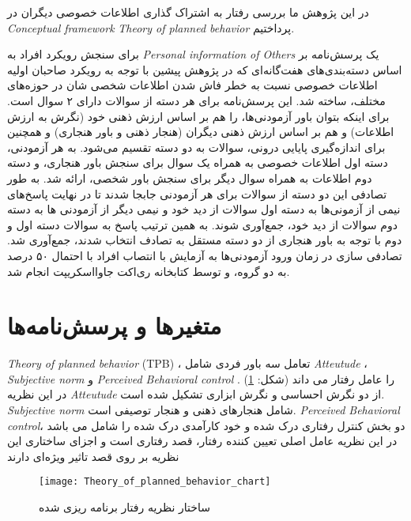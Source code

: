 در این پژوهش ما بررسی رفتار به اشتراک گذاری اطلاعات خصوصی دیگران در
\textit{
  \gls{Conceptual framework}
}
\textit{
  \gls{Theory of planned behavior}
}
پرداختیم.

برای سنجش رویکرد‍ افراد به
\textit{
  \gls{Personal information of Others}
}
یک پرسش‌نامه بر اساس دسته‌بندی‌های هفت‌گانه‌ای که در پژوهش پیشین با توجه به رویکرد صاحبان
اولیه اطلاعات خصوصی نسبت به خطر فاش شدن اطلاعات شخصی شان در حوزه‌های مختلف، ساخته شد.
این پرسش‌نامه برای هر دسته از سوالات دارای ۲ سوال است. برای اینکه بتوان باور
آزمودنی‌ها، را هم بر اساس ارزش ذهنی خود
\!(نگرش به ارزش اطلاعات)
و هم بر اساس ارزش ذهنی دیگران
\!(هنجار ذهنی و باور هنجاری)
و همچنین برای اندازه‌گیری پایایی درونی،
سوالات به دو دسته تقسیم ‌می‌شود.
به هر آزمودنی، دسته اول اطلاعات خصوصی به همراه یک سوال برای سنجش باور هنجاری، و دسته دوم
اطلاعات به همراه سوال دیگر برای سنجش باور شخصی، ارائه شد. به طور تصادفی این دو دسته از
سوالات برای هر آزمودنی جابجا شدند تا در نهایت پاسخ‌های نیمی از آزمونی‌ها به دسته اول سوالات از دید خود و نیمی
دیگر از آزمودنی ها به دسته دوم سوالات از دید خود، جمع‌آوری شوند. به همین ترتیب پاسخ به سوالات دسته اول و دوم
با توجه به باور هنجاری از دو دسته مستقل به تصادف انتخاب شدند، جمع‌آوری شد. تصادفی سازی در زمان ورود آزمودنی‌ها
به آزمایش با انتصاب افراد با احتمال ۵۰ درصد به دو گروه، و توسط کتابخانه ری‌اکت جاوااسکریپت انجام شد.

\section{متغیر‌ها و پرسش‌نامه‌ها}

\ifPlennedBahaviorTheory
  \textit{\gls{Theory of planned behavior}}
  \!(TPB)
  ، تعامل سه باور فردی شامل
  \textit{\gls{Atteutude}} ،
  \textit{\gls{Subjective norm}} و
  \textit{\gls{Perceived Behavioral control}}
  را عامل رفتار می داند
  \!(شکل: \ref{fig:Theory_of_planned_behavior_chart})
  \!\citep{ajzenTheoryPlannedBehavior2020}.
  در این نظریه
  \textit{\gls{Atteutude}}
  از دو نگرش احساسی و نگرش ابزاری تشکیل شده است.
  \textit{\gls{Subjective norm}}
  شامل  هنجارهای ذهنی و هنجار توصیفی است.
  \textit{\gls{Perceived Behavioral control}}،
  دو بخش کنترل رفتاری درک شده و خود کارآمدی درک شده را شامل می باشد
  در این نظریه عامل اصلی تعیین کننده
  رفتار، قصد رفتاری است و اجزای ساختاری این نظریه
  بر روی قصد تاثیر ویژه‌ای دارند
  \citep{mhmdpwrBrrsyTthyrTywry2022}
  \begin{figure}[ht]
    \centerline{\texttt{[image: Theory\_of\_planned\_behavior\_chart]}}
    \caption{ساختار نظریه رفتار برنامه ریزی شده
    }
    \label{fig:Theory_of_planned_behavior_chart}
  \end{figure}\\

